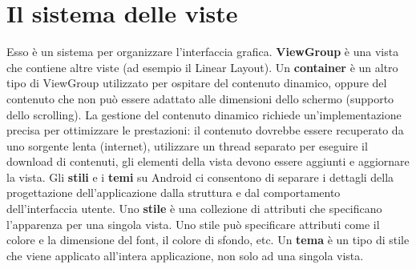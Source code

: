 \section{Il sistema delle viste}
Esso è un sistema per organizzare l'interfaccia grafica. \textbf{ViewGroup} è una vista che contiene altre viste (ad esempio il Linear Layout). Un \textbf{container} è un altro tipo di ViewGroup utilizzato per ospitare del contenuto dinamico, oppure del contenuto che non può essere adattato alle dimensioni dello schermo (supporto dello scrolling). La gestione del contenuto dinamico richiede un'implementazione precisa per ottimizzare le prestazioni: il contenuto dovrebbe essere recuperato da uno sorgente lenta (internet), utilizzare un thread separato per eseguire il download di contenuti, gli elementi della vista devono essere aggiunti e aggiornare la vista. Gli \textbf{stili} e i \textbf{temi} su Android ci consentono di separare i dettagli della progettazione dell'applicazione dalla struttura e dal comportamento dell'interfaccia utente. Uno \textbf{stile} è una collezione di attributi che specificano l'apparenza per una singola vista. Uno stile può specificare attributi come il colore e la dimensione del font, il colore di sfondo, etc. Un \textbf{tema} è un tipo di stile che viene applicato all'intera applicazione, non solo ad una singola vista.
